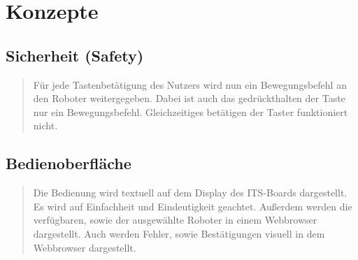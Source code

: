 \chapter{Konzepte}
\begin{quote}
	
\end{quote}

	
	
	

\section{Sicherheit (Safety)}
\begin{quote}
Für jede Tastenbetätigung des Nutzers wird nun ein Bewegungsbefehl an den Roboter weitergegeben.
Dabei ist auch das gedrückthalten der Taste nur ein Bewegungsbefehl. Gleichzeitiges betätigen der Taster funktioniert nicht. 
\end{quote}
\section{Bedienoberfläche}
\begin{quote}
	Die Bedienung wird textuell auf dem Display des ITS-Boards dargestellt. Es wird auf Einfachheit und Eindeutigkeit geachtet. Außerdem werden die verfügbaren, sowie der ausgewählte Roboter in einem Webbrowser dargestellt.
	Auch werden Fehler, sowie Bestätigungen visuell in dem Webbrowser dargestellt.
	
\end{quote}

